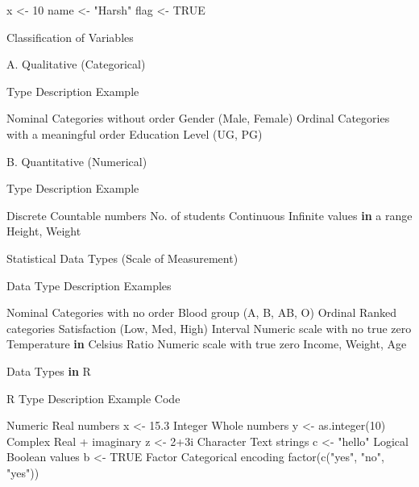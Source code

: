 \documentclass[
  letterpaper,
  DIV=11,
  numbers=noendperiod]{scrreprt}
\newenvironment{Shaded}{\begin{snugshade}}{\end{snugshade}}
\newcommand{\ConstantTok}[1]{\textcolor[rgb]{0.56,0.35,0.01}{#1}}
\newcommand{\ControlFlowTok}[1]{\textcolor[rgb]{0.00,0.23,0.31}{\textbf{#1}}}
\newcommand{\DecValTok}[1]{\textcolor[rgb]{0.68,0.00,0.00}{#1}}
\newcommand{\FloatTok}[1]{\textcolor[rgb]{0.68,0.00,0.00}{#1}}
\newcommand{\FunctionTok}[1]{\textcolor[rgb]{0.28,0.35,0.67}{#1}}
\newcommand{\NormalTok}[1]{\textcolor[rgb]{0.00,0.23,0.31}{#1}}
\newcommand{\OtherTok}[1]{\textcolor[rgb]{0.00,0.23,0.31}{#1}}
\newcommand{\SpecialCharTok}[1]{\textcolor[rgb]{0.37,0.37,0.37}{#1}}
\newcommand{\StringTok}[1]{\textcolor[rgb]{0.13,0.47,0.30}{#1}}
\begin{document}
\begin{Shaded}
\begin{Highlighting}[]
\NormalTok{x }\OtherTok{\textless{}{-}} \DecValTok{10}
\NormalTok{name }\OtherTok{\textless{}{-}} \StringTok{"Harsh"}
\NormalTok{flag }\OtherTok{\textless{}{-}} \ConstantTok{TRUE}

\NormalTok{Classification of Variables}

\NormalTok{A. }\FunctionTok{Qualitative}\NormalTok{ (Categorical)}

\NormalTok{Type    Description Example}

\NormalTok{Nominal Categories without order    }\FunctionTok{Gender}\NormalTok{ (Male, Female)}
\NormalTok{Ordinal Categories with a meaningful order  Education }\FunctionTok{Level}\NormalTok{ (UG, PG)}


\NormalTok{B. }\FunctionTok{Quantitative}\NormalTok{ (Numerical)}

\NormalTok{Type    Description Example}

\NormalTok{Discrete    Countable numbers   No. of students}
\NormalTok{Continuous  Infinite values }\ControlFlowTok{in}\NormalTok{ a range  Height, Weight}


\NormalTok{Statistical Data }\FunctionTok{Types}\NormalTok{ (Scale of Measurement)}

\NormalTok{Data Type   Description Examples}

\NormalTok{Nominal Categories with no order    Blood }\FunctionTok{group}\NormalTok{ (A, B, AB, O)}
\NormalTok{Ordinal Ranked categories   }\FunctionTok{Satisfaction}\NormalTok{ (Low, Med, High)}
\NormalTok{Interval    Numeric scale with no true zero Temperature }\ControlFlowTok{in}\NormalTok{ Celsius}
\NormalTok{Ratio   Numeric scale with true zero    Income, Weight, Age}

\NormalTok{Data Types }\ControlFlowTok{in}\NormalTok{ R}

\NormalTok{R Type  Description Example Code}

\NormalTok{Numeric Real numbers    x }\OtherTok{\textless{}{-}} \FloatTok{15.3}
\NormalTok{Integer Whole numbers   y }\OtherTok{\textless{}{-}} \FunctionTok{as.integer}\NormalTok{(}\DecValTok{10}\NormalTok{)}
\NormalTok{Complex Real }\SpecialCharTok{+}\NormalTok{ imaginary    z }\OtherTok{\textless{}{-}} \DecValTok{2}\SpecialCharTok{+}\DecValTok{3}\NormalTok{i}
\NormalTok{Character   Text strings    c }\OtherTok{\textless{}{-}} \StringTok{"hello"}
\NormalTok{Logical Boolean values  b }\OtherTok{\textless{}{-}} \ConstantTok{TRUE}
\NormalTok{Factor  Categorical encoding    }\FunctionTok{factor}\NormalTok{(}\FunctionTok{c}\NormalTok{(}\StringTok{"yes"}\NormalTok{, }\StringTok{"no"}\NormalTok{, }\StringTok{"yes"}\NormalTok{))}



\end{Highlighting}
\end{Shaded}
\end{document}
